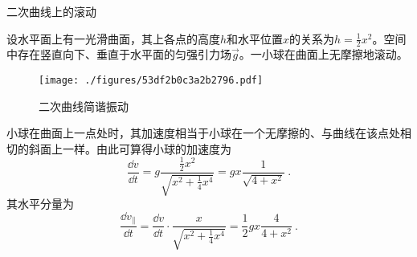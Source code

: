 \begin{example}{二次曲线上的滚动}

设水平面上有一光滑曲面，其上各点的高度$h$和水平位置$x$的关系为$h=\frac{1}{2}x^2$。空间中存在竖直向下、垂直于水平面的匀强引力场$\vec{g}$。一小球在曲面上无摩擦地滚动。

\begin{figure}[ht]
\centering
\texttt{[image: ./figures/53df2b0c3a2b2796.pdf]}
\caption{二次曲线简谐振动} \label{fig_SHOhs_2}
\end{figure}

小球在曲面上一点处时，其加速度相当于小球在一个无摩擦的、与曲线在该点处相切的斜面上一样。由此可算得小球的加速度为
\begin{equation}
\frac{\dd v}{\dd t} = g\frac{\frac{1}{2}x^2}{\sqrt{x^2+\frac{1}{4}x^4}} = gx\frac{1}{\sqrt{4+x^2}}~. 
\end{equation}
其水平分量为
\begin{equation}
\frac{\dd v_\parallel}{\dd t} = \frac{\dd v}{\dd t}\cdot\frac{x}{\sqrt{x^2+\frac{1}{4}x^4}} = \frac{1}{2}gx\frac{4}{4+x^2}~. 
\end{equation}

\end{example}



































